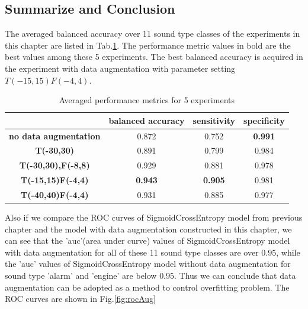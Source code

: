 \subsection{Summarize and Conclusion}
\label{subsec:sftparams}
The averaged balanced accuracy over 11 sound type classes of the experiments in this chapter are listed in Tab.\ref{tab:balfullresults}. The performance metric values in bold are the best values among these 5 experiments. The best balanced accuracy is acquired in the experiment with data augmentation with parameter setting $T(-15,15)F(-4,4)$.
\begin{table}
\begin{tabular}{|c|c|c|c|}
	\hline		&	\textbf{balanced accuracy}	&	\textbf{sensitivity}	&	\textbf{specificity	}\\
	\hline	\textbf{no data augmentation}	&	0.872	&	0.752	&	\textbf{0.991}	\\
	\hline	\textbf{T(-30,30)}	&	0.891	&	0.799	&	0.984	\\
	\hline	\textbf{T(-30,30),F(-8,8)}	&	0.929	&	0.881	&	0.978	\\
	\hline	\textbf{T(-15,15)F(-4,4)}	&	\textbf{0.943}	&	\textbf{0.905}	&	0.981	\\
	\hline	\textbf{T(-40,40)F(-4,4)}	&	0.931	&	0.885	&	0.977	\\
	\hline 
\end{tabular} 
\label{tab:balfullresults}
\caption{Averaged performance metrics for 5 experiments}
\end{table}
Also if we compare the ROC curves of SigmoidCrossEntropy model from previous chapter and the model with data augmentation constructed in this chapter, we can see that the 'auc'(area under curve) values of SigmoidCrossEntropy model with data augmentation for all of these 11 sound type classes are over $0.95$, while the 'auc' values of SigmoidCrossEntropy model without data augmentation for sound type 'alarm' and 'engine' are below $0.95$.  Thus we can conclude that data augmentation can be adopted as a method to control overfitting problem. The ROC curves are shown in Fig.\ref{fig:rocAug}
